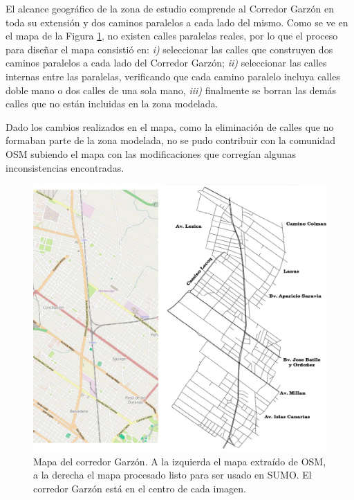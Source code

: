 El alcance geográfico de la zona de estudio comprende al Corredor Garzón en toda su extensión y dos caminos paralelos a cada lado del mismo. Como se ve en el mapa de la Figura \ref{fig:mapa_osm_sumo}, no existen calles paralelas reales, por lo que el proceso para diseñar el mapa consistió en: \textit{i)} seleccionar las calles que construyen dos caminos paralelos a cada lado del Corredor Garzón; \textit{ii)} seleccionar las calles internas entre las paralelas, verificando que cada camino paralelo incluya calles doble mano o dos calles de una sola mano, \textit{iii)} finalmente se borran las demás calles que no están incluidas en la zona modelada.

Dado los cambios realizados en el mapa, como la eliminación de calles que no formaban parte de la zona modelada, no se pudo contribuir con la comunidad OSM subiendo el mapa con las modificaciones que corregían algunas inconsistencias encontradas.



\begin{figure}[H]
	\centering
	\includegraphics[width=0.9\linewidth]{Figures/mapa_osm_sumo}
	\caption[Mapa del corredor Garzón]{Mapa del corredor Garzón. A la izquierda el mapa extraído de OSM, a la derecha el mapa procesado listo para ser usado en SUMO. El corredor Garzón está en el centro de cada imagen.}
	\label{fig:mapa_osm_sumo}
\end{figure}

